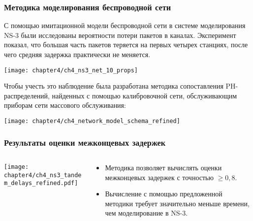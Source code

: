 

\begin{frame}
    \frametitle{Методика моделирования беспроводной сети}
    \footnotesize
    С помощью имитационной модели беспроводной сети в системе моделирования NS-3 были исследованы вероятности потери пакетов в каналах. Эксперимент показал, что большая часть пакетов теряется на первых четырех станциях, после чего средняя задержка практически не меняется.
    \begin{center}
        \texttt{[image: chapter4/ch4\_ns3\_net\_10\_props]}
    \end{center}

    \footnotesize
    Чтобы учесть это наблюдение была разработана методика сопоставления PH-распределений, найденных с помощью калибровочной сети, обслуживающим приборам сети массового обслуживания:
    \begin{center}
        \texttt{[image: chapter4/ch4\_network\_model\_schema\_refined]}
    \end{center}
\end{frame}

\begin{frame}
    \frametitle{Результаты оценки межконцевых задержек}
    \begin{columns}
        \begin{column}{0.65\textwidth}
            \texttt{[image: chapter4/ch4\_ns3\_tandem\_delays\_refined.pdf]}
        \end{column}
        \begin{column}{0.32\textwidth}
            \footnotesize
            \begin{itemize}
                \item Методика позволяет вычислять оценки межконцевых задержек с точностью $ \geqslant 0,8$.
                \item Вычисление с помощью предложенной методики требует значительно меньше времени, чем моделирование в NS-3.
            \end{itemize}
        \end{column}
    \end{columns}
\end{frame}

